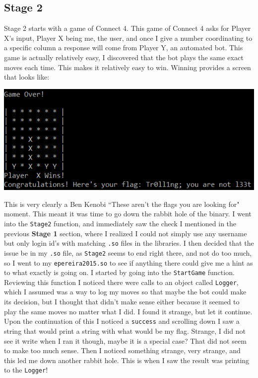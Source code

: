 \documentclass{article}
\newcommand\tab[1][.5cm]{\hspace*{#1}}
\begin{document}
	\subsection*{Stage 2}
	\tab Stage 2 starts with a game of Connect 4. This game of Connect 4 asks for Player X's input, Player X
	being me, the user, and once I give a number coordinating to a specific column a response will come
	from Player Y, an automated bot. This game is actually relatively easy, I discovered that 
	the bot plays the same exact moves each time. This makes it relatively easy to win. Winning provides a 
	screen that looks like:
	\begin{center}
		\includegraphics[scale=.6]{TrollFlag.png}
	\end{center}
	\tab This is very clearly a Ben Kenobi ``These aren't the flags you are looking for" moment. This meant
	it was time to go down the rabbit hole of the binary. I went into the \texttt{Stage2} function, and 
	immediately saw the check I mentioned in the previous \textbf{Stage 1} section, where I realized I could
	not simply use any username but only login id's with matching \texttt{.so} files in the libraries. I then
	decided that the issue be in my \texttt{.so} file, as \texttt{Stage2} seems to end right there, and not
	do too much, so I went to my \texttt{epereira2015.so} to see if anything there could give me a hint as
	to what exactly is going on. I started by going into the \texttt{StartGame} function. Reviewing this
	function I noticed there were calls to an object called \texttt{Logger}, which I assumed was a way to 
	log my moves so that maybe the bot could make its decision, but I thought that didn't make sense either
	because it seemed to play the same moves no matter what I did. I found it strange, but let it continue. 
	Upon the continuation of this I noticed a \texttt{success} and scrolling down I saw a string that would
	print a string with what would be my flag. Strange, I did not see it write when I ran it though, maybe it
	is a special case? That did not seem to make too much sense. Then I noticed something strange, very strange, and this led me down another rabbit hole. This is when I saw the result was printing to the
	\texttt{Logger}!
	
\end{document}
